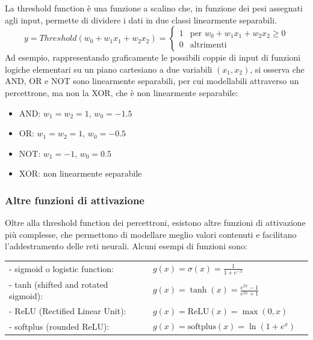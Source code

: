 La threshold function è una funzione a scalino che, in funzione dei pesi assegnati agli input, permette di dividere i dati
in due classi linearmente separabili.
\[y = Threshold(w_0 + w_1 x_1 + w_2 x_2) = \begin{cases}
	1 & \text{per } w_0 + w_1 x_1 + w_2 x_2 \geq 0 \\
	0 & \text{altrimenti}
\end{cases}\]
Ad esempio, rappresentando graficamente le possibili coppie di input di funzioni logiche elementari su un piano cartesiano
a due variabili \((x_1, x_2)\), si osserva che AND, OR e NOT sono linearmente separabili, per cui modellabili attraverso
un percettrone, ma non la XOR, che è non linearmente separabile:
\begin{center}
	\begin{minipage}{0.45\textwidth}
		\begin{itemize}
			\item AND: \(w_1 = w_2 = 1\), \(w_0 = -1.5\)
			\item OR: \(w_1 = w_2 = 1\), \(w_0 = -0.5\)
		\end{itemize}
	\end{minipage}
	\hfill
	\begin{minipage}{0.45\textwidth}
		\begin{itemize}
			\item NOT: \(w_1 = -1\), \(w_0 = 0.5\)
			\item XOR: non linearmente separabile
		\end{itemize}
	\end{minipage}
\end{center}

\subsubsection*{Altre funzioni di attivazione}
Oltre alla threshold function dei percettroni, esistono altre funzioni di attivazione più complesse, che permettono di
modellare meglio valori contenuti e facilitano l'addestramento delle reti neurali. Alcuni esempi di funzioni sono:

\begin{tabular}{l l}
	- sigmoid o logistic function: & \(\displaystyle g(x) = \sigma(x) = \frac{1}{1 + e^{-x}} \phantom{\int}\) \\
	- tanh (shifted and rotated sigmoid): & \(\displaystyle g(x) = \tanh(x) = \frac{e^{2x} - 1}{e^{2x} + 1}\) \\
	- ReLU (Rectified Linear Unit): & \(\displaystyle g(x) = \text{ReLU}(x) = \max(0, x) \phantom{\int}\) \\
	- softplus (rounded ReLU): & \(\displaystyle g(x) = \text{softplus}(x) = \ln(1 + e^x) \phantom{\int}\)
\end{tabular}

